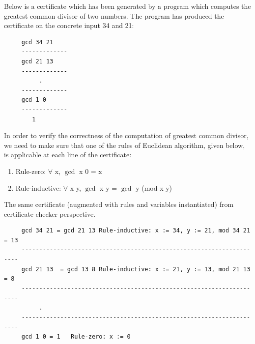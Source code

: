  
  
   \noindent 
    Below is a certificate which has been generated by a program which computes the greatest common divisor 
    of two numbers. The program has produced the certificate
    on the concrete input 34 and 21:
   \begin{verbatim}
     gcd 34 21
     -------------
     gcd 21 13
     -------------
          .
     -------------
     gcd 1 0 
     -------------
        1
   \end{verbatim}
   
   
   In order to verify the correctness of the computation of greatest common divisor, we need to 
    make sure that one of the rules of Euclidean algorithm, given below, is applicable at 
    each line of the certificate:
   \begin{enumerate}
   \item Rule-zero: $\forall$ x, $\gcd$ x 0 = x
   \item Rule-inductive: $\forall$ x y, $\gcd$ x y = $\gcd$ y (mod x y)
   \end{enumerate}

 \noindent	
  The same certificate (augmented with rules and variables instantiated) from certificate-checker perspective.
    \begin{verbatim}
     gcd 34 21 = gcd 21 13 Rule-inductive: x := 34, y := 21, mod 34 21 = 13
     ---------------------------------------------------------------------
     gcd 21 13  = gcd 13 8 Rule-inductive: x := 21, y := 13, mod 21 13 = 8
     ---------------------------------------------------------------------
          .
     ---------------------------------------------------------------------
     gcd 1 0 = 1   Rule-zero: x := 0 
   \end{verbatim}
   
